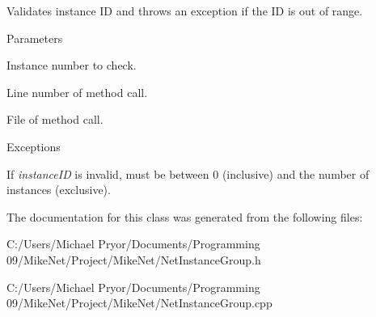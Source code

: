Validates instance ID and throws an exception if the ID is out of range. 


\begin{DoxyParams}{Parameters}
\item[{\em instanceID}]Instance number to check. \item[{\em line}]Line number of method call. \item[\mbox{\tt[in]} {\em file}]File of method call.\end{DoxyParams}

\begin{DoxyExceptions}{Exceptions}
\item[{\em \hyperlink{class_error_report}{ErrorReport}}]If {\itshape instanceID\/} is invalid, must be between 0 (inclusive) and the number of instances (exclusive). \end{DoxyExceptions}


The documentation for this class was generated from the following files:\begin{DoxyCompactItemize}
\item 
C:/Users/Michael Pryor/Documents/Programming 09/MikeNet/Project/MikeNet/NetInstanceGroup.h\item 
C:/Users/Michael Pryor/Documents/Programming 09/MikeNet/Project/MikeNet/NetInstanceGroup.cpp\end{DoxyCompactItemize}
